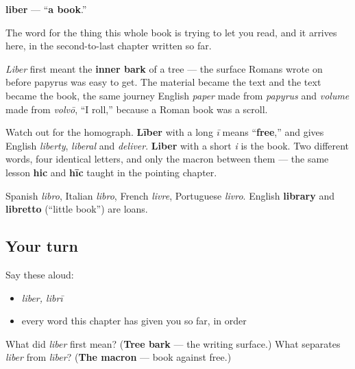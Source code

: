 \begin{cousinweb}
\textbf{liber} — \textquotedblleft{}\textbf{a book}.\textquotedblright{}

The word for the thing this whole book is trying to let you read, and it arrives here, in the second-to-last chapter written so far.

\emph{Liber} first meant the \textbf{inner bark} of a tree — the surface Romans wrote on before papyrus was easy to get. The material became the text and the text became the book, the same journey English \emph{paper} made from \emph{papyrus} and \emph{volume} made from \emph{volvō}, \textquotedblleft{}I roll,\textquotedblright{} because a Roman book was a scroll.

Watch out for the homograph. \textbf{Līber} with a long \emph{ī} means \textquotedblleft{}\textbf{free},\textquotedblright{} and gives English \emph{liberty}, \emph{liberal} and \emph{deliver}. \textbf{Liber} with a short \emph{i} is the book. Two different words, four identical letters, and only the macron between them — the same lesson \textbf{hic} and \textbf{hīc} taught in the pointing chapter.

Spanish \emph{libro}, Italian \emph{libro}, French \emph{livre}, Portuguese \emph{livro}. English \textbf{library} and \textbf{libretto} (\textquotedblleft{}little book\textquotedblright{}) are loans.
\end{cousinweb}

\subsection*{Your turn}
Say these aloud:

\begin{itemize}
\raggedright
  \item \emph{liber, librī}
  \item every word this chapter has given you so far, in order
\end{itemize}

\begin{tcolorbox}[breakable,colback=teal!4,colframe=teal!35!black,title={Before you move on}]
What did \emph{liber} first mean? (\textbf{Tree bark} — the writing surface.) What separates \emph{liber} from \emph{līber}? (\textbf{The macron} — book against free.)
\end{tcolorbox}
